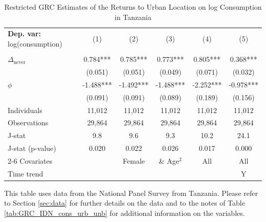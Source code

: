 \begin{table}[htbp] \centering \begin{threeparttable}
 \caption{Restricted GRC Estimates of the Returns to Urban Location on log Consumption in Tanzania} 
 \label{tab:GRC_TZA_cons_urb_unb} 
\begin{tabular}{l ccccc} \toprule  \textbf{Dep. var:}  log(consumption) 
                    &\multicolumn{1}{c}{(1)}   &\multicolumn{1}{c}{(2)}   &\multicolumn{1}{c}{(3)}   &\multicolumn{1}{c}{(4)}   &\multicolumn{1}{c}{(5)}   \\
                    &               &               &               &               &               \\
\addlinespace
$\Delta_{\text{never}}$&    0.784***&       0.785***&       0.773***&       0.805***&       0.368***\\
                    &     (0.051)   &     (0.051)   &     (0.049)   &     (0.071)   &     (0.032)   \\
\addlinespace
$\phi$              &      -1.488***&      -1.492***&      -1.488***&      -2.252***&      -0.978***\\
                    &     (0.091)   &     (0.091)   &     (0.089)   &     (0.189)   &     (0.156)   \\
\addlinespace
Individuals         &      11,012   &      11,012   &      11,012   &      11,012   &      11,012   \\
Observations        &      29,864   &      29,864   &      29,864   &      29,864   &      29,864   \\
J-stat              &         9.8   &         9.6   &         9.3   &        10.2   &        24.1   \\
J-stat (p-value)    &       0.020   &       0.022   &       0.026   &       0.017   &       0.000   \\
\cmidrule{2-6} Covariates & & Female & \& Age$^2$ & All & All  \\ Time trend & & & & & Y \\ \bottomrule \end{tabular} \begin{tablenotes} \footnotesize \item{This table uses data from the National Panel Survey from Tanzania. Please refer to Section \ref{sec:data} for further details on the data and to the notes of Table \ref{tab:GRC_IDN_cons_urb_unb} for additional information on the variables. 
}
\end{tablenotes}
\end{threeparttable}
\end{table}
